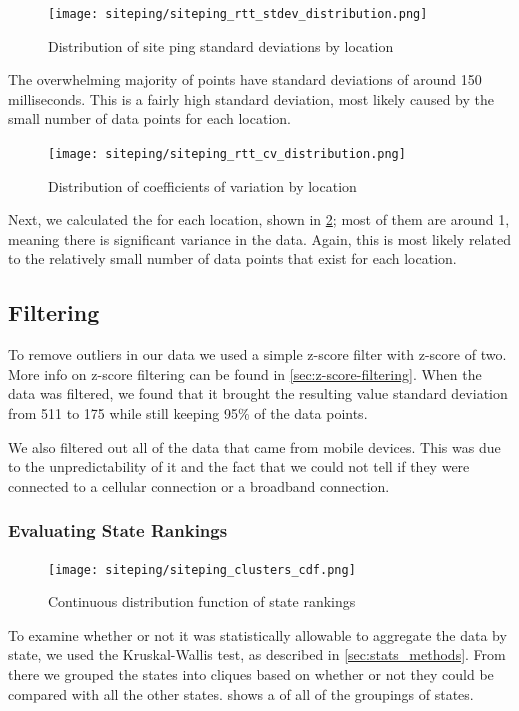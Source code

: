 \begin{figure}[htb]
    \centering
    \texttt{[image: siteping/siteping\_rtt\_stdev\_distribution.png]}
    \caption{Distribution of site ping standard deviations by location}
    \label{fig:siteping_stdev_dist}
\end{figure}

The overwhelming majority of points have standard deviations of around 150 milliseconds. This is a fairly high standard deviation, most likely caused by the small number of data points for each location.

\begin{figure}[htb]
    \centering
    \texttt{[image: siteping/siteping\_rtt\_cv\_distribution.png]}
    \caption{Distribution of coefficients of variation by location}
    \label{fig:siteping_cv_dist}
\end{figure}

Next, we calculated the \cv for each location, shown in \cref{fig:siteping_cv_dist}; most of them are around 1, meaning there is significant variance in the data. Again, this is most likely related to the relatively small number of data points that exist for each location.

\subsection{Filtering}

To remove outliers in our data we used a simple z-score filter with z-score of two. More info on z-score filtering can be found in \cref{sec:z-score-filtering}. When the data was filtered, we found that it brought the resulting value standard deviation from 511 to 175 while still keeping 95\% of the data points. 

We also filtered out all of the data that came from mobile devices. This was due to the unpredictability of it and the fact that we could not tell if they were connected to a cellular connection or a broadband connection. 

\subsubsection{Evaluating State Rankings}

\begin{figure}[htb]
    \centering
    \texttt{[image: siteping/siteping\_clusters\_cdf.png]}
    \caption{Continuous distribution function of state rankings}
    \label{fig:siteping_cdf}
\end{figure}
To examine whether or not it was statistically allowable to aggregate the data by state, we used the Kruskal-Wallis test, as described in \cref{sec:stats_methods}. From there we grouped the states into cliques based on whether or not they could be compared with all the other states.  shows a \cdf of all of the groupings of states.


